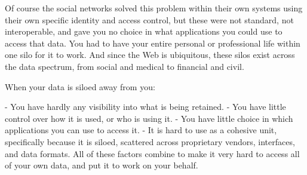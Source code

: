 Of course the social networks solved this problem within their own systems using their own specific identity and access control, but these were not standard, not interoperable, and gave you no choice in what applications you could use to access that data. You had to have your entire personal or professional life within one silo for it to work. And since the Web is ubiquitous, these silos exist across the data spectrum, from social and medical to financial and civil.

When your data is siloed away from you:

- You have hardly any visibility into what is being retained.
- You have little control over how it is used, or who is using it.
- You have little choice in which applications you can use to access it.
- It is hard to use as a cohesive unit, specifically because it is siloed, scattered across proprietary vendors, interfaces, and data formats.
All of these factors combine to make it very hard to access all of your own data, and put it to work on your behalf.